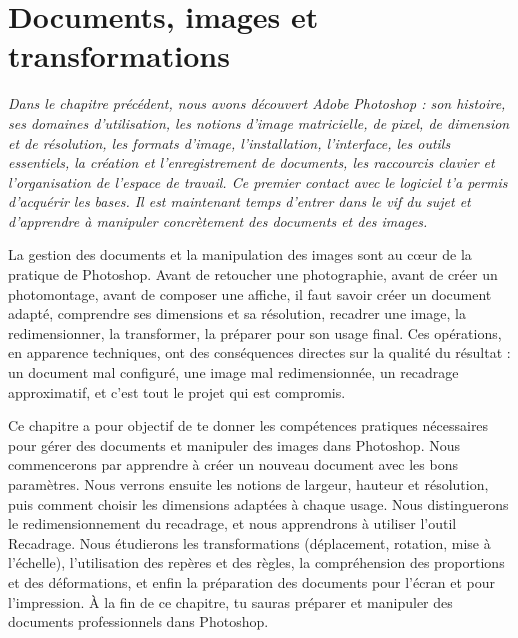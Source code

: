 
\chapter{Documents, images et transformations}

\noindent
\textit{Dans le chapitre précédent, nous avons découvert Adobe Photoshop : son histoire, ses domaines d'utilisation, les notions d'image matricielle, de pixel, de dimension et de résolution, les formats d'image, l'installation, l'interface, les outils essentiels, la création et l'enregistrement de documents, les raccourcis clavier et l'organisation de l'espace de travail. Ce premier contact avec le logiciel t'a permis d'acquérir les bases. Il est maintenant temps d'entrer dans le vif du sujet et d'apprendre à manipuler concrètement des documents et des images.}

\vspace{1em}

\noindent
La gestion des documents et la manipulation des images sont au cœur de la pratique de Photoshop. Avant de retoucher une photographie, avant de créer un photomontage, avant de composer une affiche, il faut savoir créer un document adapté, comprendre ses dimensions et sa résolution, recadrer une image, la redimensionner, la transformer, la préparer pour son usage final. Ces opérations, en apparence techniques, ont des conséquences directes sur la qualité du résultat : un document mal configuré, une image mal redimensionnée, un recadrage approximatif, et c'est tout le projet qui est compromis.

\vspace{1em}

\noindent
Ce chapitre a pour objectif de te donner les compétences pratiques nécessaires pour gérer des documents et manipuler des images dans Photoshop. Nous commencerons par apprendre à créer un nouveau document avec les bons paramètres. Nous verrons ensuite les notions de largeur, hauteur et résolution, puis comment choisir les dimensions adaptées à chaque usage. Nous distinguerons le redimensionnement du recadrage, et nous apprendrons à utiliser l'outil Recadrage. Nous étudierons les transformations (déplacement, rotation, mise à l'échelle), l'utilisation des repères et des règles, la compréhension des proportions et des déformations, et enfin la préparation des documents pour l'écran et pour l'impression. À la fin de ce chapitre, tu sauras préparer et manipuler des documents professionnels dans Photoshop.

